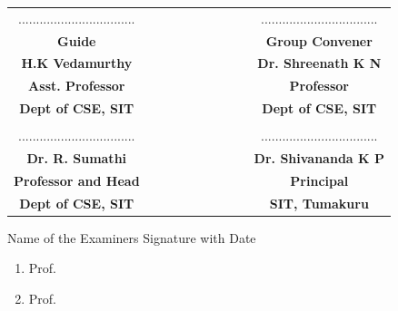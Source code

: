 \begin{table}[h!]
\centering
\begin{tabular}{cccccccccc}
.................................&&&&&&&&& .................................\\
\textbf{{\footnotesize Guide}} &&&&&&&&&\textbf{{\footnotesize Group Convener}}\\
\textbf{H.K Vedamurthy}&&&&&&&&& \textbf{Dr. Shreenath K N} \\
\textbf{{\footnotesize Asst. Professor}} &&&&&&&&& \textbf{{\footnotesize Professor}}\\
\textbf{{\footnotesize Dept of CSE, SIT}} &&&&&&&&& \textbf{{\footnotesize Dept of CSE, SIT}}\\
\\
.................................&&&&&&&&& .................................\\
\textbf{Dr. R. Sumathi} &&&&&&&&&  \textbf{Dr. Shivananda K P} \\ 
\textbf{{\footnotesize Professor and Head}} &&&&&&&&&  \textbf{{\footnotesize Principal}} \\
\textbf{{\footnotesize Dept of CSE, SIT}} &&&&&&&&&  \textbf{{\footnotesize SIT, Tumakuru}}\\

\end{tabular} 

\end{table}
Name of the Examiners	\hfill	Signature with Date
\begin{enumerate}
\item Prof.
\item Prof.
\end{enumerate}


